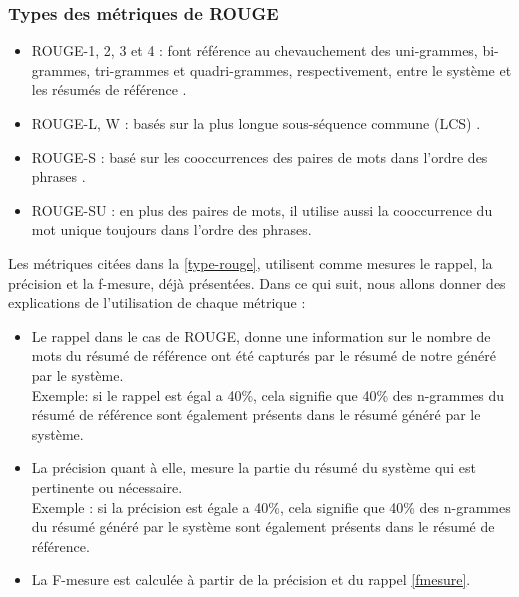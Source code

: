         \subsubsection{Types des métriques de ROUGE\label{type-rouge}}
        \begin{itemize}
            \item{ROUGE-1, 2, 3 et 4 : font référence au chevauchement des uni-grammes, bi-grammes, tri-grammes et quadri-grammes, respectivement, entre le système et les résumés de référence \cite{rouge1}.}\\
            \item{ROUGE-L, W : basés sur la plus longue sous-séquence commune (LCS) \cite{rouge2}.}\\
            \item{ROUGE-S : basé sur les cooccurrences des paires de mots dans l'ordre des phrases \cite{rouge2}.}\\
            \item{ROUGE-SU : en plus des paires de mots, il utilise aussi la cooccurrence du mot unique toujours dans l'ordre des phrases.}
        \end{itemize}

        Les métriques citées dans la \autoref{type-rouge}, utilisent comme mesures le rappel, la précision et la f-mesure, déjà présentées. Dans ce qui suit, nous allons donner des explications de l'utilisation de chaque métrique :  
        \begin{itemize}
            \item {Le rappel dans le cas de ROUGE, donne une information sur le nombre de mots du résumé de référence ont été capturés par le résumé de notre généré par le système.\\ 
                Exemple: si le rappel est égal a 40\%, cela signifie que 40\% des n-grammes du résumé de référence sont également présents dans le résumé généré par le système.}\\
            \item {La précision quant à elle, mesure la partie du résumé du système qui est pertinente ou nécessaire.\\ 
                Exemple : si la précision est égale a 40\%, cela signifie que 40\% des n-grammes du résumé généré par le système sont également présents dans le résumé de référence.}
            \item {La F-mesure est calculée à partir de la précision et du rappel \ref{fmesure}.}
        \end{itemize}

